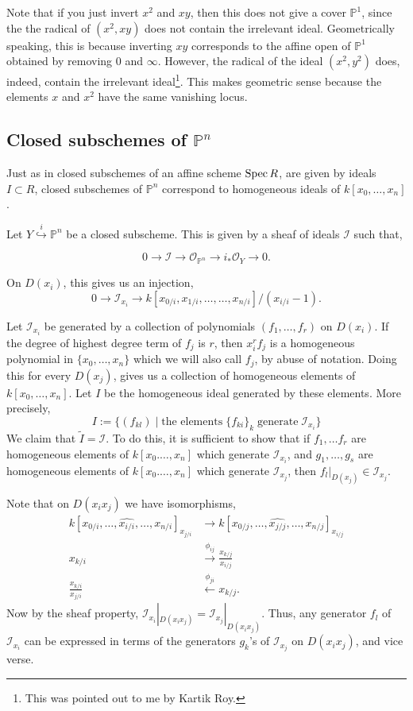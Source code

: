\documentclass[11pt]{amsart}
\newcommand{\Spec}{{\rm Spec \,}}
\renewcommand{\tilde}{\widetilde}
\newcommand{\sI}{{\mathcal I}}
\newcommand{\sO}{{\mathcal O}}
\renewcommand{\P}{{\mathbb P}}
\theoremstyle{definition}
\begin{document}
Note that if you just invert $x^2$ and $xy$, then this does not give a cover $\P^1$, since the the radical of $(x^2,xy)$ does not contain the irrelevant ideal. Geometrically speaking, this is because inverting $xy$ corresponds to the affine open of $\P^1$ obtained by removing $0$ and $\infty$. However, the radical of the ideal $(x^2,y^2)$ does, indeed, contain the irrelevant ideal\footnote{This was pointed out to me by Kartik Roy.}. This makes geometric sense because the elements $x$ and $x^2$ have the same vanishing locus.

\subsection{Closed subschemes of \texorpdfstring{$\P^n$}{Pn}} Just as in closed subschemes of an affine scheme $\Spec R$, are given by ideals $I\subset R$, closed subschemes of $\P^n$ correspond to homogeneous ideals of $k[x_0,\ldots,x_n]$.

Let $Y\overset{i}{\hookrightarrow} \P^n$ be a closed subscheme. This is given by a sheaf of ideals $\sI$ such that,

\[0\rightarrow \sI\rightarrow \sO_{\P^n}\rightarrow i_*\sO_Y\rightarrow 0.\]

On $D(x_i)$, this gives us an injection,
\[0\rightarrow \sI_{x_i}\rightarrow k[x_{0/i},x_{1/i},\ldots,\ldots,x_{n/i}]/(x_{i/i}-1). \]

Let $\sI_{x_i}$ be generated by a collection of polynomials $(f_1,\ldots,f_r)$ on $D(x_i)$. If the degree of highest degree term of $f_j$ is $r$, then $x_i^rf_j$ is a homogeneous polynomial in $\lbrace x_0,\ldots,x_n\rbrace$ which we will also call $f_j$, by abuse of notation. Doing this for every $D(x_j)$, gives us a collection of homogeneous elements of $k[x_0,\ldots,x_n]$. Let $I$ be the homogeneous ideal generated by these elements. More precisely,
\[I:=\lbrace (f_{kl})\;|\; \text{the elements}\; \lbrace f_{ki}\rbrace_k\; \text{generate}\; \sI_{x_i}\rbrace\]
We claim that $\tilde{I}=\sI$. To do this, it is sufficient to show that if $f_1,\ldots f_r$ are homogeneous elements of $k[x_0.\ldots,x_n]$ which generate $\sI_{x_i}$, and $g_1,\ldots,g_s$ are homogeneous elements of $k[x_0.\ldots,x_n]$ which generate $\sI_{x_j}$, then $f_l|_{D(x_j)}\in \sI_{x_j}$.

Note that on $D(x_i x_j)$ we have isomorphisms,
\begin{align*}
k[x_{0/i},\ldots,\widehat{x_{i/i}},\ldots,x_{n/i}]_{x_{j/i}} &\rightarrow k[x_{0/j},\ldots,\widehat{x_{j/j}},\ldots,x_{n/j}]_{x_{i/j}}\\
x_{k/i} &\overset{\phi_{ij}}{\longrightarrow} \frac{x_{k/j}}{x_{i/j}}\\
\frac{x_{k/i}}{x_{j/i}} &\overset{\phi_{ji}}{\longleftarrow} x_{k/j}.
\end{align*}
Now by the sheaf property, $\sI_{x_i}|_{D(x_i x_j)}=\sI_{x_j}|_{D(x_i x_j)}$. Thus, any generator $f_l$ of $\sI_{x_i}$ can be expressed in terms of the generators $g_k$'s of $\sI_{x_j}$ on $D(x_i x_j)$, and vice verse.
\end{document}

